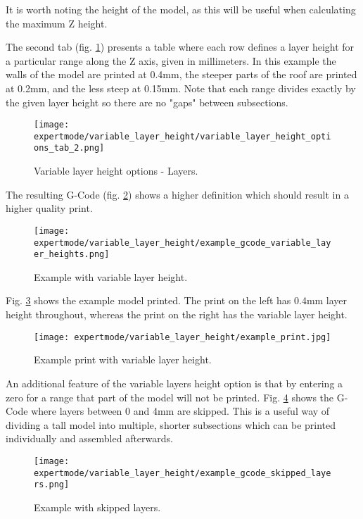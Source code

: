 It is worth noting the height of the model, as this will be useful when calculating the maximum Z height.

The second tab (fig. \ref{fig:variable_layer_height_options_tab_2}) presents a table where each row defines a layer height for a particular range along the Z axis, given in millimeters.  In this example the walls of the model are printed at 0.4mm, the steeper parts of the roof are printed at 0.2mm, and the less steep at 0.15mm.  Note that each range divides exactly by the given layer height so there are no "gaps" between subsections.

\begin{figure}[H]
\centering
\texttt{[image: expertmode/variable\_layer\_height/variable\_layer\_height\_options\_tab\_2.png]}
\caption{Variable layer height options - Layers.}
\label{fig:variable_layer_height_options_tab_2}
\end{figure}

The resulting G-Code (fig. \ref{fig:example_gcode_variable_layer_heights}) shows a higher definition which should result in a higher quality print.

\begin{figure}[H]
\centering
\texttt{[image: expertmode/variable\_layer\_height/example\_gcode\_variable\_layer\_heights.png]}
\caption{Example with variable layer height.}
\label{fig:example_gcode_variable_layer_heights}
\end{figure}

Fig. \ref{fig:example_print} shows the example model printed.  The print on the left has 0.4mm layer height throughout, whereas the print on the right has the variable layer height.

\begin{figure}[H]
\centering
\texttt{[image: expertmode/variable\_layer\_height/example\_print.jpg]}
\caption{Example print with variable layer height.}
\label{fig:example_print}
\end{figure}

An additional feature of the variable layers height option is that by entering a zero for a range that part of the model will not be printed.  Fig. \ref{fig:example_gcode_skipped_layers} shows the G-Code where layers between 0 and 4mm are skipped.  This is a useful way of dividing a tall model into multiple, shorter subsections which can be printed individually and assembled afterwards.
\begin{figure}[H]
\centering
\texttt{[image: expertmode/variable\_layer\_height/example\_gcode\_skipped\_layers.png]}
\caption{Example with skipped layers.}
\label{fig:example_gcode_skipped_layers}
\end{figure}


